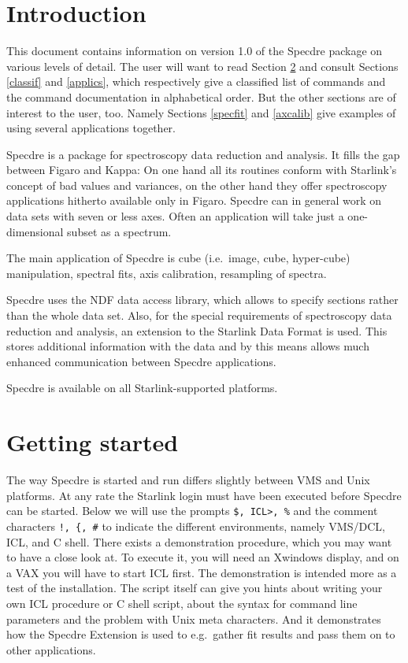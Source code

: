 \newpage

\section{Introduction}
\label{intro}

This document contains information on version 1.0 of the Specdre package
on various levels of detail. The user will want to read Section
\ref{getstart} and consult Sections \ref{classif} and \ref{applics},
which respectively give a classified list of commands and the command
documentation in alphabetical order. But the other sections are of
interest to the user, too.  Namely Sections \ref{specfit} and
\ref{axcalib} give examples of using several applications together.

Specdre is a package for spectroscopy data reduction and analysis. It
fills the gap between Figaro and Kappa: On one hand all its routines
conform with Starlink's concept of bad values and variances, on the
other hand they offer spectroscopy applications hitherto available only
in Figaro. Specdre can in general work on data sets with seven or less
axes. Often an application will take just a one-dimensional subset as a
spectrum.

The main application of Specdre is cube (i.e.\ image, cube,
hyper-cube) manipulation, spectral fits, axis calibration, resampling of
spectra.

Specdre uses the NDF data access library, which allows to specify
sections rather than the whole data set. Also, for the special
requirements of spectroscopy data reduction and analysis, an extension
to the Starlink Data Format is used. This stores additional information
with the data and by this means allows much enhanced communication
between Specdre applications.

Specdre is available on all Starlink-supported platforms.


\goodbreak
\section{Getting started}
\label{getstart}

The way Specdre is started and run differs slightly between VMS and Unix
platforms. At any rate the Starlink login must have been executed before
Specdre can be started. Below we will use the prompts {\tt \$, ICL>, \%}
and the comment characters {\tt !, \{, \#} to indicate the different
environments, namely VMS/DCL, ICL, and C shell. There exists a
demonstration procedure, which you may want to have a close look at.  To
execute it, you will need an Xwindows display, and on a VAX you will
have to start ICL first.  The demonstration is intended more as a test
of the installation. The script itself can give you hints about writing
your own ICL procedure or C shell script, about the syntax for command
line parameters and the problem with Unix meta characters. And it
demonstrates how the Specdre Extension is used to e.g.\ gather fit
results and pass them on to other applications.

